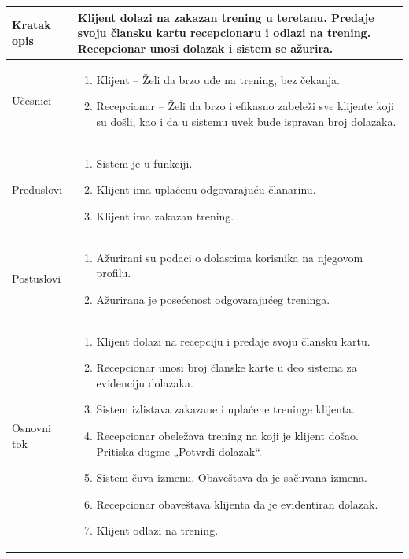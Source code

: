 \documentclass[../main.tex]{subfiles}
\begin{document}
\begin{longtable}{| p{} | p{} |} 
\hline
    Kratak opis &  Klijent dolazi na zakazan trening u teretanu. Predaje svoju člansku kartu recepcionaru i odlazi na trening. Recepcionar unosi dolazak i sistem se ažurira.\\ 
\hline    
    Učesnici & \begin{enumerate}
        \item Klijent – Želi da brzo uđe na trening, bez čekanja.
        \item Recepcionar – Želi da brzo i efikasno zabeleži sve klijente koji su došli, kao i da u sistemu uvek bude ispravan broj dolazaka.   
     \end{enumerate}\\
\hline
   Preduslovi & \begin{enumerate}
       \item Sistem je u funkciji.
       \item Klijent ima uplaćenu odgovarajuću članarinu.
       \item Klijent ima zakazan trening.
   \end{enumerate}\\
\hline  
    Postuslovi & \begin{enumerate}
        \item Ažurirani su podaci o dolascima korisnika na njegovom profilu.
        \item Ažurirana je posećenost odgovarajućeg treninga.
    \end{enumerate}\\
\hline
    Osnovni tok & \begin{enumerate}
        \item Klijent dolazi na recepciju i predaje svoju člansku kartu.
        \item Recepcionar unosi broj članske karte u deo sistema za evidenciju dolazaka.
        \item Sistem izlistava zakazane i uplaćene treninge klijenta.
        \item Recepcionar obeležava trening na koji je klijent došao. Pritiska dugme „Potvrdi dolazak“.
        \item Sistem čuva izmenu. Obaveštava da je sačuvana izmena.
        \item Recepcionar obaveštava klijenta da je evidentiran dolazak.
        \item Klijent odlazi na trening.

\end{enumerate}
\end{longtable}
\end{document}
